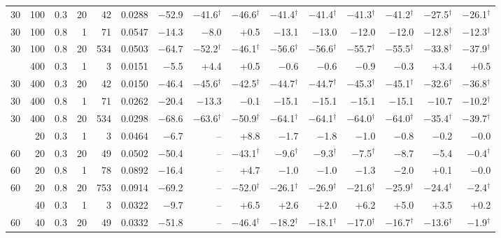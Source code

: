 \begin{tabular}{@{}rrrrr rrrrrrrrrr@{}}
30 & 100 & 0.3 & 20 & 42 & 0.0288 & $-$52.9 & $-$41.6$^{\dagger}$ & $-$46.6$^{\dagger}$ & $-$41.4$^{\dagger}$ & $-$41.4$^{\dagger}$ & $-$41.3$^{\dagger}$ & $-$41.2$^{\dagger}$ & $-$27.5$^{\dagger}$ & $-$26.1$^{\dagger}$ \\
30 & 100 & 0.8 & 1 & 71 & 0.0547 & $-$14.3 & $-$8.0 & +0.5 & $-$13.1 & $-$13.0 & $-$12.0 & $-$12.0 & $-$12.8$^{\dagger}$ & $-$12.3$^{\dagger}$ \\
30 & 100 & 0.8 & 20 & 534 & 0.0503 & $-$64.7 & $-$52.2$^{\dagger}$ & $-$46.1$^{\dagger}$ & $-$56.6$^{\dagger}$ & $-$56.6$^{\dagger}$ & $-$55.7$^{\dagger}$ & $-$55.5$^{\dagger}$ & $-$33.8$^{\dagger}$ & $-$37.9$^{\dagger}$ \\
\addlinespace[1pt]
30 & 400 & 0.3 & 1 & 3 & 0.0151 & $-$5.5 & +4.4 & +0.5 & $-$0.6 & $-$0.6 & $-$0.9 & $-$0.3 & +3.4 & +0.5 \\
30 & 400 & 0.3 & 20 & 42 & 0.0150 & $-$46.4 & $-$45.6$^{\dagger}$ & $-$42.5$^{\dagger}$ & $-$44.7$^{\dagger}$ & $-$44.7$^{\dagger}$ & $-$45.3$^{\dagger}$ & $-$45.1$^{\dagger}$ & $-$32.6$^{\dagger}$ & $-$36.8$^{\dagger}$ \\
30 & 400 & 0.8 & 1 & 71 & 0.0262 & $-$20.4 & $-$13.3 & $-$0.1 & $-$15.1 & $-$15.1 & $-$15.1 & $-$15.1 & $-$10.7 & $-$10.2$^{\dagger}$ \\
30 & 400 & 0.8 & 20 & 534 & 0.0298 & $-$68.6 & $-$63.6$^{\dagger}$ & $-$50.9$^{\dagger}$ & $-$64.1$^{\dagger}$ & $-$64.1$^{\dagger}$ & $-$64.0$^{\dagger}$ & $-$64.0$^{\dagger}$ & $-$35.4$^{\dagger}$ & $-$39.7$^{\dagger}$ \\
\addlinespace[1pt]
60 & 20 & 0.3 & 1 & 3 & 0.0464 & $-$6.7 & -- & +8.8 & $-$1.7 & $-$1.8 & $-$1.0 & $-$0.8 & $-$0.2 & $-$0.0 \\
60 & 20 & 0.3 & 20 & 49 & 0.0502 & $-$50.4 & -- & $-$43.1$^{\dagger}$ & $-$9.6$^{\dagger}$ & $-$9.3$^{\dagger}$ & $-$7.5$^{\dagger}$ & $-$8.7 & $-$5.4 & $-$0.4$^{\dagger}$ \\
60 & 20 & 0.8 & 1 & 78 & 0.0892 & $-$16.4 & -- & +4.7 & $-$1.0 & $-$1.0 & $-$1.3 & $-$2.0 & +0.1 & $-$0.0 \\
60 & 20 & 0.8 & 20 & 753 & 0.0914 & $-$69.2 & -- & $-$52.0$^{\dagger}$ & $-$26.1$^{\dagger}$ & $-$26.9$^{\dagger}$ & $-$21.6$^{\dagger}$ & $-$25.9$^{\dagger}$ & $-$24.4$^{\dagger}$ & $-$2.4$^{\dagger}$ \\
\addlinespace[1pt]
60 & 40 & 0.3 & 1 & 3 & 0.0322 & $-$9.7 & -- & +6.5 & +2.6 & +2.0 & +6.2 & +5.0 & +3.5 & +0.2 \\
60 & 40 & 0.3 & 20 & 49 & 0.0332 & $-$51.8 & -- & $-$46.4$^{\dagger}$ & $-$18.2$^{\dagger}$ & $-$18.1$^{\dagger}$ & $-$17.0$^{\dagger}$ & $-$16.7$^{\dagger}$ & $-$13.6$^{\dagger}$ & $-$1.9$^{\dagger}$ \\

\end{tabular}
